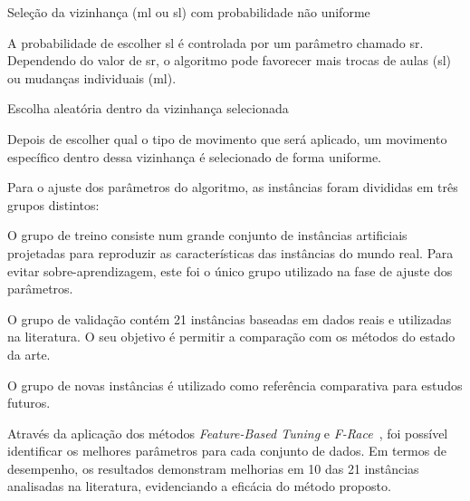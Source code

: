 \begin{compactitem}
    \item Seleção da vizinhança (\gls{ml} ou \gls{sl}) com probabilidade não uniforme
    
    A probabilidade de escolher \gls{sl} é controlada por um parâmetro chamado \gls{sr}. Dependendo do valor de \gls{sr}, o algoritmo pode favorecer mais trocas de aulas (\gls{sl}) ou mudanças individuais (\gls{ml}).

    \item Escolha aleatória dentro da vizinhança selecionada
    
    Depois de escolher qual o tipo de movimento que será aplicado, um movimento específico dentro dessa vizinhança é selecionado de forma uniforme.
\end{compactitem}

Para o ajuste dos parâmetros do algoritmo, as instâncias foram divididas em três grupos distintos:

\begin{compactenum}
    \item O grupo de treino consiste num grande conjunto de instâncias artificiais projetadas para reproduzir as características das instâncias do mundo real. Para evitar sobre-aprendizagem, este foi o único grupo utilizado na fase de ajuste dos parâmetros.
    
    \item O grupo de validação contém 21 instâncias baseadas em dados reais e utilizadas na literatura. O seu objetivo é permitir a comparação com os métodos do estado da arte.
    
    \item O grupo de novas instâncias é utilizado como referência comparativa para estudos futuros.
\end{compactenum}

Através da aplicação dos métodos \textit{Feature-Based Tuning} e \textit{F-Race}~\cite{FRaceIterated-Birattari-2010}, foi possível identificar os melhores parâmetros para cada conjunto de dados. Em termos de desempenho, os resultados demonstram melhorias em 10 das 21 instâncias analisadas na literatura, evidenciando a eficácia do método proposto.



